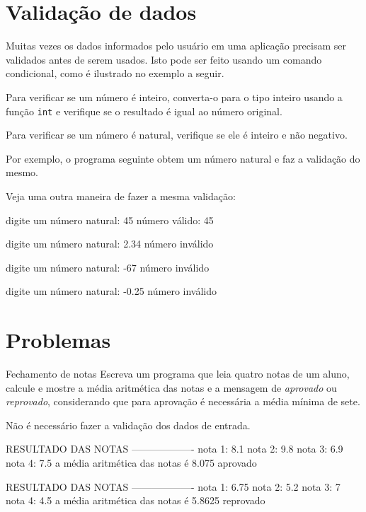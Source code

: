 \documentclass[11pt,fleqn]{practice}
\begin{document}
\section{Validação de dados}

Muitas vezes os dados informados pelo usuário em uma aplicação precisam
ser validados antes de serem usados. Isto pode ser feito usando um
comando condicional, como é ilustrado no exemplo a seguir.

Para verificar se um número é inteiro, converta-o para o tipo inteiro
usando a função \texttt{int} e verifique se o resultado é igual ao
número original.

Para verificar se um número é natural, verifique se ele é inteiro e não
negativo.

Por exemplo, o programa seguinte obtem um número natural e faz a
validação do mesmo.

Veja uma outra maneira de fazer a mesma validação:

\begin{runexample}
digite um número natural: 45
número válido: 45
\end{runexample}

\begin{runexample}
digite um número natural: 2.34
número inválido
\end{runexample}

\begin{runexample}
digite um número natural: -67
número inválido
\end{runexample} 

\begin{runexample}
digite um número natural: -0.25
número inválido
\end{runexample}


\section{Problemas}

\begin{task}[breakable]{Fechamento de notas}{}
  Escreva um programa que leia quatro notas de um aluno, calcule e
  mostre a média aritmética das notas e a mensagem de \emph{aprovado} ou
  \emph{reprovado}, considerando que para aprovação é necessária a média
  mínima de sete.

  Não é necessário fazer a validação dos dados de entrada.

  \begin{runexample}
RESULTADO DAS NOTAS
-------------------
nota 1: 8.1
nota 2: 9.8
nota 3: 6.9
nota 4: 7.5
a média aritmética das notas é 8.075
aprovado
  \end{runexample}

  \begin{runexample}
RESULTADO DAS NOTAS
-------------------
nota 1: 6.75
nota 2: 5.2
nota 3: 7
nota 4: 4.5
a média aritmética das notas é 5.8625
reprovado
  \end{runexample}

  \tcblower
  \solution
\end{task}
\end{document}
